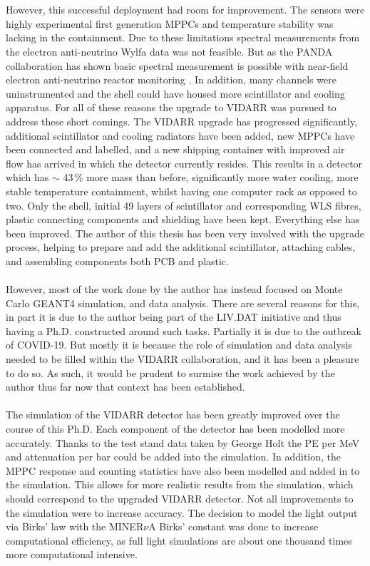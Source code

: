 \\\\However, this successful deployment had room for improvement. The sensors were highly experimental first generation MPPCs and temperature stability was lacking in the containment. Due to these limitations spectral measurements from the electron anti-neutrino Wylfa data was not feasible. But as the PANDA collaboration has shown basic spectral measurement is possible with near-field electron anti-neutrino reactor monitoring \cite{IIRIE_Panda_2021}. In addition, many channels were uninstrumented and the shell could have housed more scintillator and cooling apparatus. For all of these reasons the upgrade to VIDARR was pursued to address these short comings. The VIDARR upgrade has progressed significantly, additional scintillator and cooling radiators have been added, new MPPCs have been connected and labelled, and a new shipping container with improved air flow has arrived in which the detector currently resides. This results in a detector which has $\sim$ 43\,\% more mass than before, significantly more water cooling, more stable temperature containment, whilst having one computer rack as opposed to two. Only the shell, initial 49 layers of scintillator and corresponding WLS fibres, plastic connecting components and shielding have been kept. Everything else has been improved. The author of this thesis has been very involved with the upgrade process, helping to prepare and add the additional scintillator, attaching cables, and assembling components both PCB and plastic. 
\\\\However, most of the work done by the author has instead focused on Monte Carlo GEANT4 \cite{Agostinelli:2002hh} simulation, and data analysis. There are several reasons for this, in part it is due to the author being part of the LIV.DAT initiative and thus having a Ph.D. constructed around such tasks. Partially it is due to the outbreak of COVID-19. But mostly it is because the role of simulation and data analysis needed to be filled within the VIDARR collaboration, and it has been a pleasure to do so. As such, it would be prudent to surmise the work achieved by the author thus far now that context has been established. 
\\\\The simulation of the VIDARR detector has been greatly improved over the course of this Ph.D. Each component of the detector has been modelled more accurately. Thanks to the test stand data taken by George Holt the PE per MeV and attenuation per bar could be added into the simulation. In addition, the MPPC response and counting statistics have also been modelled and added in to the simulation. This allows for more realistic results from the simulation, which should correspond to the upgraded VIDARR detector. Not all improvements to the simulation were to increase accuracy. The decision to model the light output via Birks' law with the MINER$\nu$A Birks' constant was done to increase computational efficiency, as full light simulations are about one thousand times more computational intensive. 

